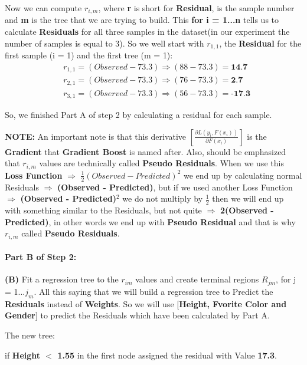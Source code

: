 \documentclass[12pt, a4paper]{article} %
\begin{document}
Now we can compute $r_{i,m}$, where \textbf{r} is short for \textbf{Residual},  is the sample number and \textbf{m} is the tree that we are trying to build. This \textbf{for i = 1...n} tells us to calculate \textbf{Residuals} for all three samples in the dataset(in our experiment the number of samples is equal to 3). So we well start with $r_{1, 1}$, the \textbf{Residual} for the first sample (i = 1) and the first tree (m = 1):
\begin{align*}
    & r_{1, 1} = (Observed - 73.3) \Rightarrow (88 - 73.3) = \textbf{14.7}\\
    & r_{2, 1} = (Observed - 73.3) \Rightarrow (76 - 73.3) = \textbf{2.7}\\
    & r_{3, 1} = (Observed - 73.3) \Rightarrow (56 - 73.3) = \textbf{-17.3}
\end{align*}

So, we finished Part A of step 2 by calculating a residual for each sample.

\textbf{NOTE:} An important note is that this derivative $[\frac{\partial L(y_{i}, F(x_{i}))}{\partial F(x_{i})}]$ is the \textbf{Gradient} that \textbf{Gradient Boost} is named after. Also, should be emphasized that $r_{i, m}$ values are technically called \textbf{Pseudo Residuals}. When we use this \textbf{Loss Function} $\Rightarrow$ $\frac{1}{2}(Observed - Predicted)^2$ we end up by calculating normal Residuals $\Rightarrow$ \textbf{(Observed - Predicted)}, but if we used another Loss Function $\Rightarrow$ \textbf{(Observed - Predicted)$^2$} we do not multiply by $\frac{1}{2}$ then we will end up with something similar to the Residuals, but not quite $\Rightarrow$ \textbf{2(Observed - Predicted)}, in other words we end up with \textbf{Pseudo Residual} and that is why $r_{i, m}$ called \textbf{Pseudo Residuals}.


\paragraph{Part B of Step 2:} \textbf{(B)} Fit a regression tree to the $r_{im}$ values and create terminal regions $R_{jm}$, for j = 1...$j_{m}$. All this saying that we will build a regression tree to Predict the \textbf{Residuals} instead of \textbf{Weights}. So we will use [\textbf{Height, Fvorite Color and Gender}] to predict the Residuals which have been calculated by Part A.
\newline

The new tree:

if \textbf{Height $<$ 1.55} in the first node assigned the residual with Value \textbf{17.3}.
\end{document}
